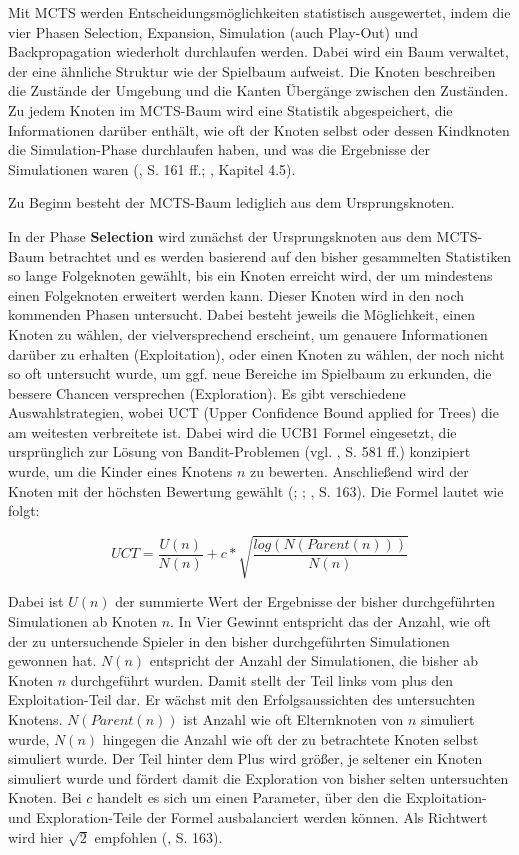 
Mit MCTS werden Entscheidungsmöglichkeiten statistisch ausgewertet, indem die vier Phasen Selection, Expansion, Simulation (auch Play-Out) und Backpropagation wiederholt durchlaufen werden. Dabei wird ein Baum verwaltet, der eine ähnliche Struktur wie der Spielbaum aufweist. Die Knoten beschreiben die Zustände der Umgebung und die Kanten Übergänge zwischen den Zuständen. Zu jedem Knoten im MCTS-Baum wird eine Statistik abgespeichert, die Informationen darüber enthält, wie oft der Knoten selbst oder dessen Kindknoten die Simulation-Phase durchlaufen haben, und was die Ergebnisse der Simulationen waren (\cite{Russell.2020}, S. 161 ff.; \cite{Ferguson.January2019}, Kapitel 4.5).

Zu Beginn besteht der MCTS-Baum lediglich aus dem Ursprungsknoten.

In der Phase \textbf{Selection} wird zunächst der Ursprungsknoten aus dem MCTS-Baum betrachtet und es werden basierend auf den bisher gesammelten Statistiken so lange Folgeknoten gewählt, bis ein Knoten erreicht wird, der um mindestens einen Folgeknoten erweitert werden kann. Dieser Knoten wird in den noch kommenden Phasen untersucht. Dabei besteht jeweils die Möglichkeit, einen Knoten zu wählen, der vielversprechend erscheint, um genauere Informationen darüber zu erhalten (Exploitation), oder einen Knoten zu wählen, der noch nicht so oft untersucht wurde, um ggf. neue Bereiche im Spielbaum zu erkunden, die bessere Chancen versprechen (Exploration). Es gibt verschiedene Auswahlstrategien, wobei UCT (Upper Confidence Bound applied for Trees) die am weitesten verbreitete ist. Dabei wird die UCB1 Formel eingesetzt, die ursprünglich zur Lösung von Bandit-Problemen (vgl. \cite{Russell.2020}, S. 581 ff.) konzipiert wurde, um die Kinder eines Knotens $n$ zu bewerten. Anschließend wird der Knoten mit der höchsten Bewertung gewählt (\cite{Kocsis.2006}; \cite{Browne.2012}; \cite{Russell.2020}, S. 163). Die Formel lautet wie folgt:

\begin{equation*}
	UCT = \frac{U(n)}{N(n)} + c * \sqrt{\frac{log(N(Parent(n)))}{N(n)}}
\end{equation*}

Dabei ist $U(n)$ der summierte Wert der Ergebnisse der bisher durchgeführten Simulationen ab Knoten $n$. In Vier Gewinnt entspricht das der Anzahl, wie oft der zu untersuchende Spieler in den bisher durchgeführten Simulationen gewonnen hat. $N(n)$ entspricht der Anzahl der Simulationen, die bisher ab Knoten $n$ durchgeführt wurden. Damit stellt der Teil links vom plus den Exploitation-Teil dar. Er wächst mit den Erfolgsaussichten des untersuchten Knotens.
$N(Parent(n))$ ist Anzahl wie oft Elternknoten von $n$ simuliert wurde, $N(n)$ hingegen die Anzahl wie oft der zu betrachtete Knoten selbst simuliert wurde. Der Teil hinter dem Plus wird größer, je seltener ein Knoten simuliert wurde und fördert damit die Exploration von bisher selten untersuchten Knoten.
Bei $c$ handelt es sich um einen Parameter, über den die Exploitation- und Exploration-Teile der Formel ausbalanciert werden können. Als Richtwert wird hier $\sqrt{2}$ empfohlen (\cite{Russell.2020}, S. 163).

